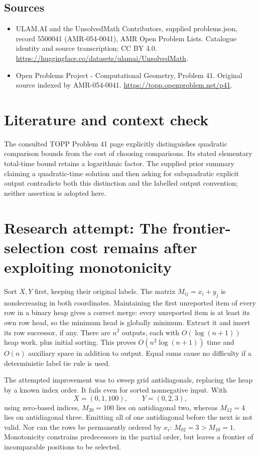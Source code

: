 \documentclass[11pt,a4paper]{article}
\begin{document}
\subsection{Sources}
\begin{itemize}
\item[S1] ULAM.AI and the UnsolvedMath Contributors, supplied problems.json, record 5500041 (AMR-054-0041), AMR Open Problem Lists. Catalogue identity and source transcription; CC BY 4.0.
\url{https://huggingface.co/datasets/ulamai/UnsolvedMath}.
\item[S2] Open Problems Project - Computational Geometry, Problem 41. Original source indexed by AMR-054-0041.
\url{https://topp.openproblem.net/p41}.
\end{itemize}

\section{Literature and context check}
The consulted TOPP Problem 41 page explicitly distinguishes quadratic
comparison bounds from the cost of choosing comparisons. Its stated elementary
total-time bound retains a logarithmic factor. The supplied prior summary
claiming a quadratic-time solution and then asking for subquadratic explicit
output contradicts both this distinction and the labelled output convention;
neither assertion is adopted here.
\section{Research attempt: The frontier-selection cost remains after exploiting monotonicity}
Sort $X,Y$ first, keeping their original labels. The matrix
$M_{ij}=x_i+y_j$ is nondecreasing in both coordinates. Maintaining the first
unreported item of every row in a binary heap gives a correct merge: every
unreported item is at least its own row head, so the minimum head is globally
minimum. Extract it and insert its row successor, if any. There are $n^2$
outputs, each with $O(\log(n+1))$ heap work, plus initial sorting. This proves
$O(n^2\log(n+1))$ time and $O(n)$ auxiliary space in addition to output.
Equal sums cause no difficulty if a deterministic label tie rule is used.

The attempted improvement was to sweep grid antidiagonals, replacing the heap
by a known index order. It fails even for sorted nonnegative input. With
\[
 X=(0,1,100),\qquad Y=(0,2,3),
\]
using zero-based indices, $M_{20}=100$ lies on antidiagonal two, whereas
$M_{12}=4$ lies on antidiagonal three. Emitting all of one antidiagonal before
the next is not valid. Nor can the rows be permanently ordered by $x_i$:
$M_{02}=3>M_{10}=1$. Monotonicity constrains predecessors in the partial order,
but leaves a frontier of incomparable positions to be selected.
\end{document}
